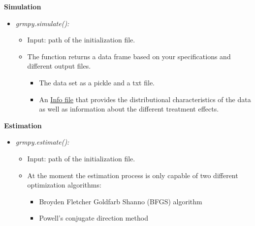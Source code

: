\begin{frame}
\textbf{Simulation}

\medskip
\begin{itemize}\setlength\itemsep{1em}
\item \textit{grmpy.simulate():}\medskip
\begin{itemize}\setlength\itemsep{1em}
\item Input: path of the initialization file.
\item The function returns a data frame based on your specifications and different output files.
\begin{itemize}\setlength\itemsep{1em}
\item The data set as a pickle and a txt file.
\item An \href{examples/data.grmpy.info}{Info file} that provides the distributional characteristics of the data as well as information about the different treatment effects.
\end{itemize}

\end{itemize}
\end{itemize}
\end{frame}

\begin{frame}
\textbf{Estimation}

\medskip
\begin{itemize}\setlength\itemsep{1em}
\item \textit{grmpy.estimate():}\medskip
  \begin{itemize}\setlength\itemsep{1em}
  \item Input: path of the initialization file.
  \item At the moment the estimation process is only capable of two different optimization algorithms:
    \begin{itemize}\setlength\itemsep{1em}
    \item Broyden Fletcher Goldfarb Shanno (BFGS) algorithm
    \item  Powell's conjugate direction method
\end{itemize}
\end{itemize}
\end{itemize}

\end{frame}

